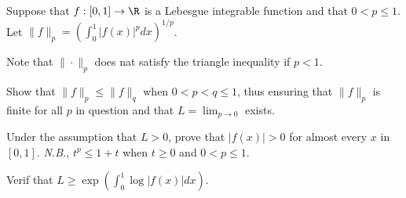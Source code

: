 Suppose that $f:[0,1]\rightarrow \R$ is a Lebesgue integrable function
and that $0<p\leq 1$. Let $\|f\|_p=(\int_0^1|f(x)|^pdx)^{1/p}$. 

Note that $\|\cdot \|_p$ does nat satisfy the triangle inequality if
$p<1$.
\begin{alist}
\item Show that $\|f\|_p\leq \|f\|_q$ when $0<p<q\leq 1$, thus ensuring
that $\|f\|_p$ is finite for all $p$ in question and that
$L=\lim_{p\rightarrow 0}$ exists.
\item Under the assumption that $L>0$, prove that $|f(x)|>0$ for
almost every $x$ in $[0,1]$. \emph{N.B.}, $t^p\leq 1+t$ when $t\geq 0$
and $0<p\leq 1$.
\item Verif that $L\geq \exp(\int_0^1 \log |f(x)|dx)$.
\end{alist}
